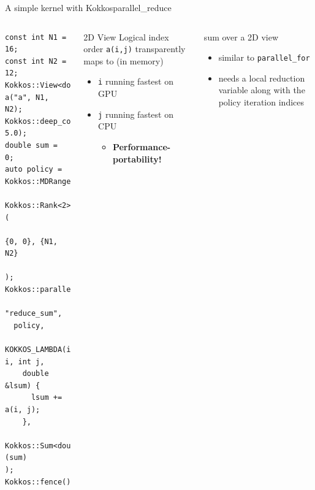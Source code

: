\begin{frame}[fragile]{A simple kernel with Kokkos}{parallel\_reduce}
  \begin{columns}
      \begin{verbatim}
const int N1 = 16;
const int N2 = 12;
Kokkos::View<double**> a("a", N1, N2);
Kokkos::deep_copy(a, 5.0);
double sum = 0;
auto policy = Kokkos::MDRangePolicy<
                Kokkos::Rank<2>>(
                  {0, 0}, {N1, N2}
                );
Kokkos::parallel_reduce(
  "reduce_sum",
  policy,
  KOKKOS_LAMBDA(int i, int j, 
    double &lsum) {
      lsum += a(i, j);
    },
  Kokkos::Sum<double>(sum)
);
Kokkos::fence();
      \end{verbatim}
        \begin{block}{2D View}
          Logical index order \texttt{a(i,j)} transparently maps to (in memory)
            \begin{itemize}
              \item \texttt{i} running fastest on GPU
              \vspace{0.3cm}
              \item \texttt{j} running fastest on CPU 
              \vspace{0.3cm}
              \begin{itemize}
                \item \textbf{Performance-portability!}
              \end{itemize}
            \end{itemize}
        \end{block}
      \vspace{0.4cm}
      \begin{block}{sum over a 2D view}
        \begin{itemize}
          \item similar to \verb|parallel_for|
          \vspace{0.3cm}
          \item needs a local reduction variable along with the policy iteration indices
        \end{itemize}
      \end{block}
    \end{columns}
\end{frame}

